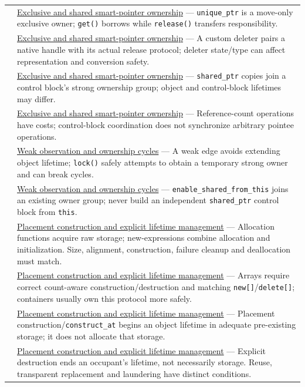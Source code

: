 {\begin{longtable}[]{@{}
  >{\raggedright\arraybackslash}p{}
  >{\raggedright\arraybackslash}p{}@{}}
151 & \hyperref[appendix-51602cabe815]{Exclusive and shared smart-pointer ownership} --- \texttt{unique\_ptr} is a move-only exclusive owner; \texttt{get()} borrows while \texttt{release()} transfers responsibility. \\
152 & \hyperref[appendix-51602cabe815]{Exclusive and shared smart-pointer ownership} --- A custom deleter pairs a native handle with its actual release protocol; deleter state/type can affect representation and conversion safety. \\
153 & \hyperref[appendix-51602cabe815]{Exclusive and shared smart-pointer ownership} --- \texttt{shared\_ptr} copies join a control block's strong ownership group; object and control-block lifetimes may differ. \\
154 & \hyperref[appendix-51602cabe815]{Exclusive and shared smart-pointer ownership} --- Reference-count operations have costs; control-block coordination does not synchronize arbitrary pointee operations. \\
155 & \hyperref[appendix-b9548675eb2b]{Weak observation and ownership cycles} --- A weak edge avoids extending object lifetime; \texttt{lock()} safely attempts to obtain a temporary strong owner and can break cycles. \\
156 & \hyperref[appendix-b9548675eb2b]{Weak observation and ownership cycles} --- \texttt{enable\_shared\_from\_this} joins an existing owner group; never build an independent \texttt{shared\_ptr} control block from \texttt{this}. \\
157 & \hyperref[appendix-f56c3e43fd4e]{Placement construction and explicit lifetime management} --- Allocation functions acquire raw storage; new-expressions combine allocation and initialization. Size, alignment, construction, failure cleanup and deallocation must match. \\
158 & \hyperref[appendix-f56c3e43fd4e]{Placement construction and explicit lifetime management} --- Arrays require correct count-aware construction/destruction and matching \texttt{new{[}{]}}/\texttt{delete{[}{]}}; containers usually own this protocol more safely. \\
159 & \hyperref[appendix-f56c3e43fd4e]{Placement construction and explicit lifetime management} --- Placement construction/\texttt{construct\_at} begins an object lifetime in adequate pre-existing storage; it does not allocate that storage. \\
160 & \hyperref[appendix-f56c3e43fd4e]{Placement construction and explicit lifetime management} --- Explicit destruction ends an occupant's lifetime, not necessarily storage. Reuse, transparent replacement and laundering have distinct conditions. \\
\end{longtable}
}

